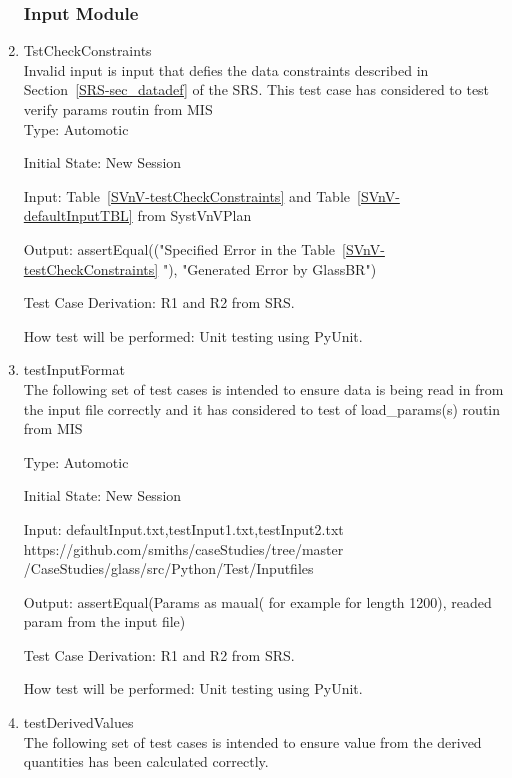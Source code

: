 \documentclass[12pt]{article}
\begin{document}
\begin{enumerate}

\subsubsection{Input Module}

\item{TstCheckConstraints} \\
Invalid input is input that defies the data constraints described
in Section~\ref{SRS-sec_datadef} of the SRS. This test case has considered to test verify params routin from MIS \\
Type: Automotic

Initial State: New Session

Input: Table~\ref{SVnV-testCheckConstraints}  and Table~\ref{SVnV-defaultInputTBL} from SystVnVPlan


Output: assertEqual(("Specified Error in the Table~\ref{SVnV-testCheckConstraints} "), "Generated Error by GlassBR")

Test Case Derivation: R1 and R2 from SRS.

How test will be performed: Unit testing using PyUnit.

\item{testInputFormat} \\
The following set of test cases is intended to ensure data is being read in from the input file correctly and it has considered to test of load\_params(s) routin from MIS

Type: Automotic

Initial State: New Session

Input: defaultInput.txt,testInput1.txt,testInput2.txt \\ https://github.com/smiths/caseStudies/tree/master
/CaseStudies/glass/src/Python/Test/Inputfiles


Output: assertEqual(Params as maual( for example for length 1200), readed param from the input file)

Test Case Derivation: R1 and R2 from SRS.

How test will be performed: Unit testing using PyUnit.

\item{testDerivedValues} \\
The following set of test cases is intended to ensure value from the derived quantities has been calculated correctly.


\end{enumerate}
\end{document}
